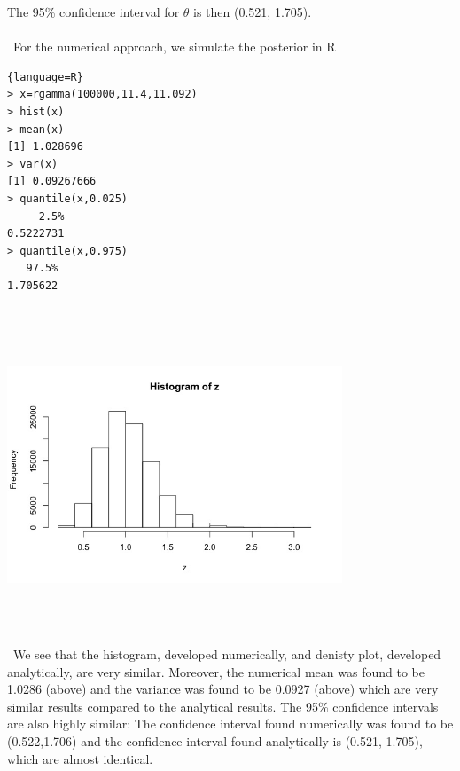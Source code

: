 \documentclass[10pt,a4paper]{article}
\begin{document}
The 95\% confidence interval for $\theta$ is then (0.521, 1.705).\\
\\\
For the numerical approach, we simulate the posterior in R
\begin{lstlisting}{language=R}
> x=rgamma(100000,11.4,11.092)
> hist(x)
> mean(x)
[1] 1.028696
> var(x)
[1] 0.09267666
> quantile(x,0.025)
     2.5% 
0.5222731 
> quantile(x,0.975)
   97.5% 
1.705622 
\end{lstlisting}
\includegraphics[width=10cm,height=10cm,keepaspectratio]{prob1part4b}
\\\
We see that the histogram, developed numerically, and denisty plot, developed analytically, are very similar. Moreover, the numerical mean was found to be 1.0286 (above) and the variance was found to be 0.0927 (above) which are very similar results compared to the analytical results. The 95\% confidence intervals are also highly similar: The confidence interval found numerically was found to be (0.522,1.706) and the confidence interval found analytically is (0.521, 1.705), which are almost identical.
\end{document}
